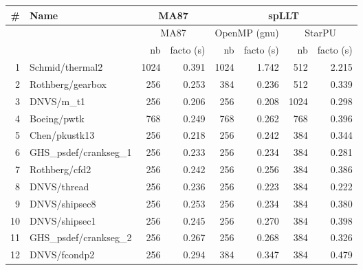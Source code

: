 \begin{tabular}{rl|rr|rr|rr}
  \hline
  \# & Name & \multicolumn{2}{c}{MA87}        & \multicolumn{4}{c}{spLLT}                                                      \\
  \hline
       &  & \multicolumn{2}{c}{MA87}        & \multicolumn{2}{c}{OpenMP (gnu)} & \multicolumn{2}{c}{StarPU}                  \\ 
  \cline{3-8}
       &  & nb                              & facto (s)                        & nb     & facto (s) & nb     & facto (s)     \\
  \hline
    1    & Schmid/thermal2                 & 1024                             & 0.391  & 1024      & 1.742  & 512  & 2.215  \\
   2     & Rothberg/gearbox                & 256                              & 0.253  & 384       & 0.236  & 512  & 0.339  \\
   3     & DNVS/m\_t1                      & 256                              & 0.206  & 256       & 0.208  & 1024 & 0.298  \\
   4     & Boeing/pwtk                     & 768                              & 0.249  & 768       & 0.262  & 768  & 0.396  \\
   5     & Chen/pkustk13                   & 256                              & 0.218  & 256       & 0.242  & 384  & 0.344  \\
   6     & GHS\_psdef/crankseg\_1          & 256                              & 0.233  & 256       & 0.234  & 384  & 0.281  \\
   7     & Rothberg/cfd2                   & 256                              & 0.242  & 256       & 0.256  & 384  & 0.386  \\
   8     & DNVS/thread                     & 256                              & 0.236  & 256       & 0.223  & 384  & 0.222  \\
   9     & DNVS/shipsec8                   & 256                              & 0.253  & 256       & 0.234  & 384  & 0.380  \\
  10     & DNVS/shipsec1                   & 256                              & 0.245  & 256       & 0.270  & 384  & 0.398  \\
  11     & GHS\_psdef/crankseg\_2          & 256                              & 0.267  & 256       & 0.268  & 384  & 0.326  \\
  12     & DNVS/fcondp2                    & 256                              & 0.294  & 384       & 0.347  & 384  & 0.479  \\

\end{tabular}
